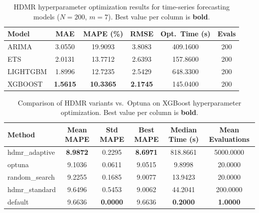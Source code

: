 \begin{table}[htbp]
\centering
\caption{HDMR hyperparameter optimization results for time-series forecasting models ($N{=}200$, $m{=}7$). Best value per column is \textbf{bold}.}
\label{tab:forecasting}
\begin{tabular}{lccccc}
\toprule
Model & MAE & MAPE (\%) & RMSE & Opt.~Time (s) & Evals \\
\midrule
ARIMA & 3.0550 & 19.9093 & 3.8083 & 409.1600 & 200 \\
ETS & 2.0131 & 13.7712 & 2.6393 & 157.8600 & 200 \\
LIGHTGBM & 1.8996 & 12.7235 & 2.5429 & 648.3300 & 200 \\
XGBOOST & \textbf{1.5615} & \textbf{10.3365} & \textbf{2.1745} & 145.0400 & 200 \\
\bottomrule
\end{tabular}
\end{table}

\begin{table}[htbp]
\centering
\small
\caption{Comparison of HDMR variants vs.\ Optuna on XGBoost hyperparameter optimization. Best value per column is \textbf{bold}.}
\label{tab:comparison}
\begin{tabular}{lccccc}
\toprule
Method & Mean MAPE & Std MAPE & Best MAPE & Median Time (s) & Mean Evaluations \\
\midrule
hdmr_adaptive & \textbf{8.9872} & 0.2295 & \textbf{8.6971} & 818.8661 & 5000.0000 \\
optuna & 9.1036 & 0.0611 & 9.0515 & 9.8998 & 20.0000 \\
random_search & 9.2255 & 0.1685 & 9.0077 & 13.9423 & 20.0000 \\
hdmr_standard & 9.6496 & 0.5453 & 9.0062 & 44.2041 & 200.0000 \\
default & 9.6636 & \textbf{0.0000} & 9.6636 & \textbf{0.2000} & \textbf{1.0000} \\
\bottomrule
\end{tabular}
\end{table}


